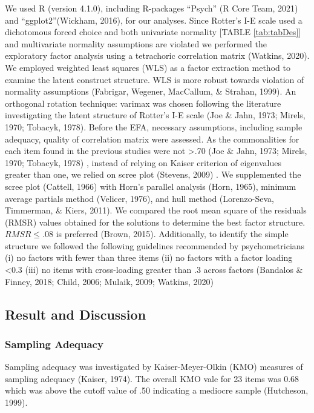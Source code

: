 \documentclass[
  english,
  man]{apa6}
\begin{document}
We used R (version 4.1.0), including R-packages ``Psych'' (R Core Team, 2021) and ``ggplot2''(Wickham, 2016), for our analyses. Since Rotter's I-E scale used a dichotomous forced choice and both univariate normality {[}TABLE \ref{tab:tabDes}{]} and multivariate normality assumptions are violated we performed the exploratory factor analysis using a tetrachoric correlation matrix (Watkins, 2020). We employed weighted least squares (WLS) as a factor extraction method to examine the latent construct structure. WLS is more robust towards violation of normality assumptions (Fabrigar, Wegener, MacCallum, \& Strahan, 1999). An orthogonal rotation technique: varimax was chosen following the literature investigating the latent structure of Rotter's I-E scale (Joe \& Jahn, 1973; Mirels, 1970; Tobacyk, 1978). Before the EFA, necessary assumptions, including sample adequacy, quality of correlation matrix were assessed. As the commonalities for each item found in the previous studies were not \textgreater.70 (Joe \& Jahn, 1973; Mirels, 1970; Tobacyk, 1978) , instead of relying on Kaiser criterion of eigenvalues greater than one, we relied on scree plot (Stevens, 2009) . We supplemented the scree plot (Cattell, 1966) with Horn's parallel analysis (Horn, 1965), minimum average partials method (Velicer, 1976), and hull method (Lorenzo-Seva, Timmerman, \& Kiers, 2011). We compared the root mean square of the residuals (RMSR) values obtained for the solutions to determine the best factor structure. \(RMSR \le .08\) is preferred (Brown, 2015). Additionally, to identify the simple structure we followed the following guidelines recommended by psychometricians (i) no factors with fewer than three items (ii) no factors with a factor loading \textless0.3 (iii) no items with cross-loading greater than .3 across factors (Bandalos \& Finney, 2018; Child, 2006; Mulaik, 2009; Watkins, 2020)

\hypertarget{result-and-discussion}{%
\subsection{Result and Discussion}\label{result-and-discussion}}

\hypertarget{sampling-adequacy}{%
\subsubsection{Sampling Adequacy}\label{sampling-adequacy}}

Sampling adequacy was investigated by Kaiser-Meyer-Olkin (KMO) measures of sampling adequacy (Kaiser, 1974). The overall KMO vale for 23 items was 0.68 which was above the cutoff value of .50 indicating a mediocre sample (Hutcheson, 1999).
\end{document}
